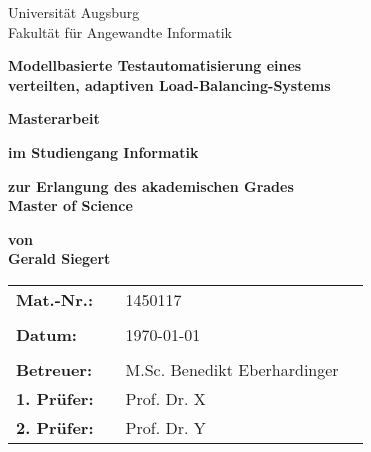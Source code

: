 \begin{center}
    {\Large{Universität Augsburg\\Fakultät für Angewandte Informatik}}
    \vspace{4\baselineskip}
    
    \begin{onehalfspace}
        \textbf{\large{Modellbasierte Testautomatisierung eines\\verteilten, adaptiven Load-Balancing-Systems}}
    \end{onehalfspace}
    \vspace{3\baselineskip}
    
    \textbf{{\Large{Masterarbeit}}}
    \vspace{1\baselineskip}
    
    \textbf{im Studiengang Informatik}
    \vspace{1\baselineskip}
    
    \textbf{zur Erlangung des akademischen Grades\\Master of Science}
    \vspace{1\baselineskip}
    
    \textbf{von\\Gerald Siegert}
    \vspace{\fill}
    
    \begin{singlespace}
        \begin{tabular}{llll}
            \textbf{Mat.-Nr.:}  &  & 1450117                      &  \\
            &  &  \\
            \textbf{Datum:}     &  & \today                       &  \\
            &  &  \\
            \textbf{Betreuer:}  &  & M.Sc. Benedikt Eberhardinger &  \\
            \textbf{1. Prüfer:} &  & Prof. Dr. X                  &  \\
            \textbf{2. Prüfer:} &  & Prof. Dr. Y                  &
        \end{tabular}
    \end{singlespace}
\end{center}
